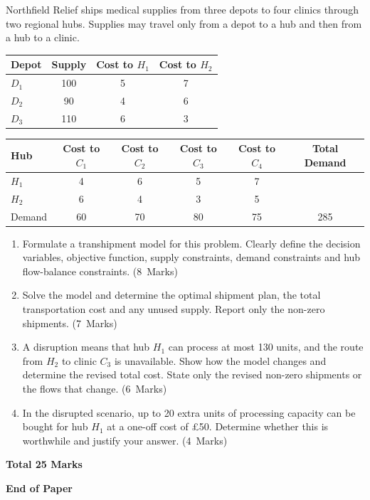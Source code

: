 \documentclass[11pt,a4paper]{article}
\newcommand{\markalloc}[1]{\nobreak\hfill\mbox{(#1 Marks)}}
\newcommand{\questiontotal}[1]{\begin{flushright}\textbf{Total #1 Marks}\end{flushright}}
\begin{document}
Northfield Relief ships medical supplies from three depots to four clinics through two regional hubs.
Supplies may travel only from a depot to a hub and then from a hub to a clinic.

\begin{center}
\begin{tabular}{lccc}
\toprule
Depot & Supply & Cost to $H_1$ & Cost to $H_2$ \\
\midrule
$D_1$ & 100 & 5 & 7 \\
$D_2$ & 90 & 4 & 6 \\
$D_3$ & 110 & 6 & 3 \\
\bottomrule
\end{tabular}
\end{center}

\begin{center}
\begin{tabular}{lccccc}
\toprule
Hub & Cost to $C_1$ & Cost to $C_2$ & Cost to $C_3$ & Cost to $C_4$ & Total Demand \\
\midrule
$H_1$ & 4 & 6 & 5 & 7 & \\
$H_2$ & 6 & 4 & 3 & 5 & \\
\midrule
Demand & 60 & 70 & 80 & 75 & 285 \\
\bottomrule
\end{tabular}
\end{center}

\begin{enumerate}
\item Formulate a transhipment model for this problem. Clearly define the decision variables, objective function, supply constraints, demand constraints and hub flow-balance constraints. \markalloc{8}

\item Solve the model and determine the optimal shipment plan, the total transportation cost and any unused supply. Report only the non-zero shipments. \markalloc{7}

\item A disruption means that hub $H_1$ can process at most 130 units, and the route from $H_2$ to clinic $C_3$ is unavailable. Show how the model changes and determine the revised total cost. State only the revised non-zero shipments or the flows that change. \markalloc{6}

\item In the disrupted scenario, up to 20 extra units of processing capacity can be bought for hub $H_1$ at a one-off cost of \pounds50. Determine whether this is worthwhile and justify your answer. \markalloc{4}
\end{enumerate}

\questiontotal{25}

\vfill

\begin{center}
\textbf{End of Paper}
\end{center}
\end{document}

